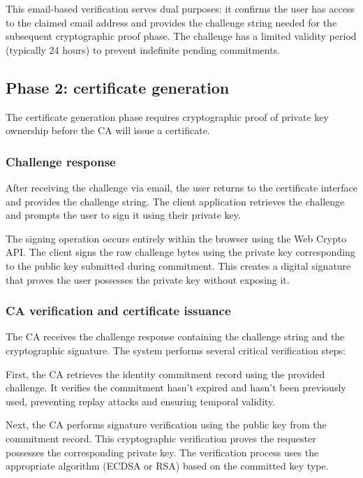 This email-based verification serves dual purposes: it confirms the user has 
access to the claimed email address and provides the challenge string needed 
for the subsequent cryptographic proof phase. The challenge has a limited 
validity period (typically 24 hours) to prevent indefinite pending commitments.

\subsection{Phase 2: certificate generation}

The certificate generation phase requires cryptographic proof of private key 
ownership before the CA will issue a certificate.

\subsubsection{Challenge response}

After receiving the challenge via email, the user returns to the certificate 
interface and provides the challenge string. The client application retrieves 
the challenge and prompts the user to sign it using their private key.

The signing operation occurs entirely within the browser using the Web Crypto API. 
The client signs the raw challenge bytes using the private key corresponding to 
the public key submitted during commitment. This creates a digital signature 
that proves the user possesses the private key without exposing it.

\subsubsection{CA verification and certificate issuance}

The CA receives the challenge response containing the challenge string and the 
cryptographic signature. The system performs several critical verification steps:

First, the CA retrieves the identity commitment record using the provided challenge. 
It verifies the commitment hasn't expired and hasn't been previously used, 
preventing replay attacks and ensuring temporal validity.

Next, the CA performs signature verification using the public key from the 
commitment record. This cryptographic verification proves the requester possesses 
the corresponding private key. The verification process uses the appropriate 
algorithm (ECDSA or RSA) based on the committed key type.

